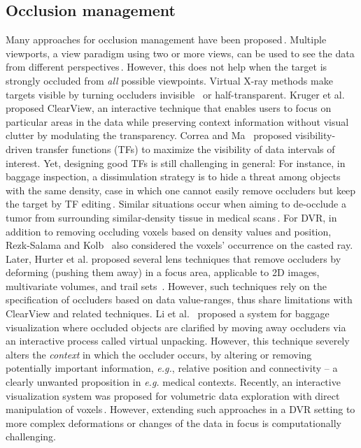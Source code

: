 \subsection{Occlusion management}
%
Many approaches for occlusion management have been proposed\,\cite{4483791}. Multiple viewports, a view paradigm using two or more views, can be used to see the data from different perspectives\,\cite{WangBaldonado:2000:GUM:345513.345271}. However, this does not help when the target is strongly occluded from \emph{all} possible viewpoints. Virtual X-ray methods make targets visible by turning occluders invisible~\cite{Burns:2008:ACC:1457515.1409107} or half-transparent. Kruger et al.~\cite{4015450} proposed ClearView, an interactive technique that enables users to focus on particular areas in the data while preserving context information without visual clutter by modulating the transparency. Correa and Ma~\cite{5416704} proposed visibility-driven transfer functions (TFs) to maximize the visibility of data intervals of interest. Yet, designing good TFs is still challenging in general: For instance, in baggage inspection, a dissimulation strategy is to hide a threat among objects with the same density, case in which one cannot easily remove occluders but keep the target by TF editing\,\cite{xxx}. Similar situations occur when aiming to de-occlude a tumor from surrounding similar-density tissue in medical scans\,\cite{xxx}. For DVR, in addition to removing occluding voxels based on density values and position, Rezk-Salama and Kolb~\cite{CGF:CGF979} also considered the voxels' occurrence on the casted ray. Later, Hurter et al. proposed several lens techniques that remove occluders by deforming (pushing them away) in a focus area, applicable to 2D images, multivariate volumes, and trail sets~\cite{moleview,6787171}. However, such techniques rely on the specification of occluders based on data value-ranges, thus share limitations with ClearView and related techniques. Li et al.~\cite{Li:2012:LVV:2425296.2425325} proposed a system for baggage visualization where occluded objects are clarified by moving away occluders via an interactive process called virtual unpacking. However, this technique severely alters the \emph{context} in which the occluder occurs, by altering or removing potentially important information, \emph{e.g.}, relative position and connectivity -- a clearly unwanted proposition in \emph{e.g.} medical contexts. Recently, an interactive visualization system was proposed for volumetric data exploration with direct manipulation of voxels\,\cite{7819413}. However, extending such approaches in a DVR setting to more complex deformations or changes of the data in focus is computationally challenging.

